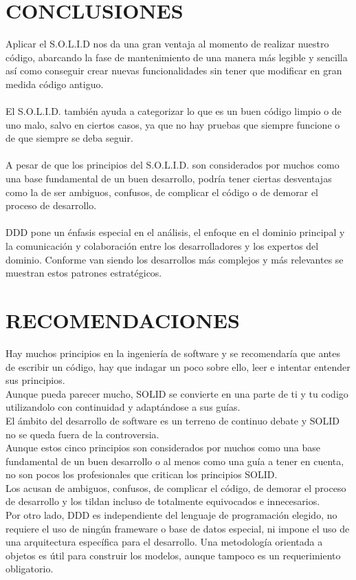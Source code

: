 \documentclass[11pt,letterpaper]{article}
\begin{document}
  \section{CONCLUSIONES}
 Aplicar el S.O.L.I.D nos da una gran ventaja al momento de realizar nuestro código, abarcando la fase de mantenimiento de una manera más legible y sencilla así como conseguir crear nuevas funcionalidades sin tener que modificar en gran medida código antiguo.\\\\
El S.O.L.I.D. también ayuda a categorizar lo que es un buen código limpio o de uno malo, salvo en ciertos casos, ya que no hay pruebas que siempre funcione o de que siempre se deba seguir.\\\\
A pesar de que los principios del S.O.L.I.D. son considerados por muchos como una base fundamental de un buen desarrollo, podría tener ciertas desventajas como la de ser ambiguos, confusos, de complicar el código o de demorar el proceso de desarrollo.\\\\
DDD pone un énfasis especial en el análisis, el enfoque en el dominio principal y la
comunicación y colaboración entre los desarrolladores y los expertos del dominio. Conforme
van siendo los desarrollos más complejos y más relevantes se muestran estos patrones
estratégicos.\\


\section{RECOMENDACIONES}
Hay muchos principios en la ingeniería de software y se recomendaría que antes de escribir
un código, hay que indagar un poco sobre ello, leer e intentar entender sus principios.\\
Aunque pueda parecer mucho, SOLID se convierte en una parte de ti y tu codigo utilizandolo
con continuidad y adaptándose a sus guías.\\
El ámbito del desarrollo de software es un terreno de continuo debate y SOLID no se queda
fuera de la controversia.\\
Aunque estos cinco principios son considerados por muchos como una base fundamental
de un buen desarrollo o al menos como una guía a tener en cuenta, no son pocos los
profesionales que critican los principios SOLID.\\
Los acusan de ambiguos, confusos, de complicar el código, de demorar el proceso de
desarrollo y los tildan incluso de totalmente equivocados e innecesarios.\\
Por otro lado, DDD es independiente del lenguaje de programación elegido, no requiere el
uso de ningún frameware o base de datos especial, ni impone el uso de una arquitectura
específica para el desarrollo. Una metodología orientada a objetos es útil para construir los
modelos, aunque tampoco es un requerimiento obligatorio.
\end{document}
